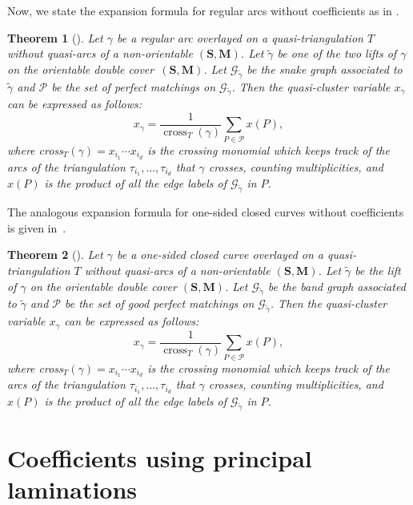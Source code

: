 \documentclass[pdftex]{sigma}
\numberwithin{equation}{section}
\newtheorem{Theorem}{Theorem}[section]
\theoremstyle{definition}
\newcommand{\SM}{(\mathbf{S}, \mathbf{M})}
\begin{document}
Now, we state the expansion formula for regular arcs without coefficients as in \cite[Theorem~5.3]{Wil19}.

\begin{Theorem}[\cite{Wil19}]\label{theorem:expformularegarcs}
 Let $\gamma$ be a regular arc overlayed on a quasi-triangulation $T$ without quasi-arcs of a non-orientable $\SM$. Let $\tilde{\gamma}$ be one of the two lifts of $\gamma$ on the orientable double cover~$\SM$. Let $\mathcal{G}_{\tilde{\gamma}}$ be the snake graph associated to $\tilde{\gamma}$ and $\mathcal{P}$ be the set of perfect matchings on $\mathcal{G}_{\tilde{\gamma}}$. Then the quasi-cluster variable $x_\gamma$ can be expressed as follows:
 \[x_\gamma = \frac{1}{\operatorname{cross}_T(\gamma)} \sum_{P \in \mathcal{P}} x(P),\]
 where cross$_T(\gamma) = x_{i_1} \cdots x_{i_d}$ is the crossing monomial which keeps track of the arcs of the triangulation $\tau_{i_1}, \dots, \tau_{i_d}$ that $\gamma$ crosses, counting multiplicities, and $x(P)$ is the product of all the edge labels of $\mathcal{G}_{\tilde{\gamma}}$ in $P$.
\end{Theorem}

The analogous expansion formula for one-sided closed curves without coefficients is given in~\cite[Theorem 5.19]{Wil19}.

\begin{Theorem}[{\cite{Wil19}}]\label{theorem:expformulaquasiarcsnocoeff}
 Let $\gamma$ be a one-sided closed curve overlayed on a quasi-triangulation $T$ without quasi-arcs of a non-orientable $\SM$. Let $\tilde{\gamma}$ be the lift of $\gamma$ on the orientable double cover $\SM$. Let $\mathcal{G}_{\tilde{\gamma}}$ be the band graph associated to $\tilde{\gamma}$ and $\mathcal{P}$ be the set of good perfect matchings on $\mathcal{G}_{\tilde{\gamma}}$. Then the quasi-cluster variable $x_\gamma$ can be expressed as follows:
 \[x_\gamma = \frac{1}{\operatorname{cross}_T(\gamma)} \sum_{P \in \mathcal{P}} x(P),\]
 where cross$_T(\gamma) = x_{i_1} \cdots x_{i_d}$ is the crossing monomial which keeps track of the arcs of the triangulation $\tau_{i_1}, \dots, \tau_{i_d}$ that $\gamma$ crosses, counting multiplicities, and $x(P)$ is the product of all the edge labels of $\mathcal{G}_{\tilde{\gamma}}$ in $P$.
\end{Theorem}

\section{Coefficients using principal laminations}\label{section:coefficients}
\end{document}
